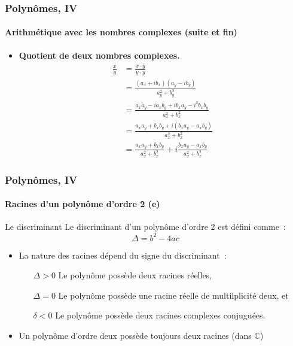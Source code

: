 \documentclass[10pt,notheorems]{beamer}
\theoremstyle{plain}
\theoremstyle{definition} %
\begin{document}
\begin{frame}
  \frametitle{Polynômes, IV}
  \framesubtitle{Arithmétique avec les nombres complexes (suite et fin)}
  \hypertarget{slide_polynome_2_imaginaire_4}{}

  \bigskip

  \begin{itemize}

  \item \textbf{Quotient de deux nombres complexes.}
    \[
      \begin{split}
        \frac{x}{y} &= \frac{x \cdot \bar y}{y \cdot y}\\
        &= \frac{(a_x+ib_x)(a_y-ib_y)}{a_y^2 + b_y^2}\\
        &= \frac{a_xa_y-ia_xb_y+ib_xa_y-i^2b_xb_y}{a_x^2 + b_x^2}\\
        &= \frac{a_xa_y+b_xb_y+i(b_xa_y-a_xb_y)}{a_x^2 + b_x^2}\\
        &= \frac{a_xa_y+b_xb_y}{a_x^2 + b_x^2} + i \frac{b_xa_y-a_xb_y}{a_x^2 + b_x^2}
      \end{split}
    \]

  \end{itemize}

\end{frame}


\begin{frame}
  \frametitle{Polynômes, IV}
  \framesubtitle{Racines d'un polynôme d'ordre 2 (e)}
  \hypertarget{slide_polynome_2_racines_5}{}

  \bigskip

  \begin{block}{Le discriminant}
    Le discriminant d'un polynôme d'ordre 2 est défini comme~:
    \[
      \Delta = b^2-4ac
    \]
  \end{block}

  \bigskip

  \begin{itemize}

  \item La nature des racines dépend du signe du discriminant~:\newline

    \begin{itemize}
    \item[$\Delta>0$] Le polynôme possède deux racines réelles,\newline
    \item[$\Delta=0$] Le polynôme possède une racine réelle de multilplicité deux, et\newline
    \item[$\delta<0$] Le polynôme possède deux racines complexes conjuguées.\newline
    \end{itemize}

  \item Un polynôme d'ordre deux possède toujours deux racines (dans $\mathbb C$)

  \end{itemize}

\end{frame}
\end{document}
